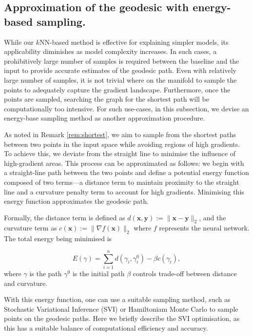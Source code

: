 \subsection{Approximation of the geodesic with energy-based sampling.}
 While our $k$NN-based method is effective for explaining simpler models, its applicability diminishes as model complexity increases. In such cases, a prohibitively large number of samples is required between the baseline and the input to provide accurate estimates of the geodesic path. Even with relatively large number of samples, it is not trivial where on the manifold to sample the points to adequately capture the gradient landscape. Furthermore, once the points are sampled, searching the graph for the shortest path will be computationally too intensive. For such use-cases, in this subsection, we devise an energy-base sampling method as another approximation procedure.

As noted in Remark \ref{rem:shortest}, we aim to sample from the shortest paths between two points in the input space while avoiding regions of high gradients. To achieve this, we deviate from the straight line to minimise the influence of high-gradient areas. This process can be approximated as follows: we begin with a straight-line path between the two points and define a potential energy function composed of two terms—a distance term to maintain proximity to the straight line and a curvature penalty term to account for high gradients. Minimising this energy function approximates the geodesic path.

Formally, the distance term is defined as $d(\textbf{x},\textbf{y}) := \|\textbf{x}-\textbf{y}\|_2$, and the curvature term as $c(\textbf{x}):=\|\nabla f(\textbf{x})\|_2$ where $f$ represents the neural network. The total energy being minimised is

\begin{equation}
E(\gamma) = \sum_{i=1}^{n} d(\gamma_i, \gamma^0_i) - \beta c(\gamma_i), 
\label{eq:energy}
\end{equation}
where $\gamma$ is the path $\gamma^0$ is the initial path $\beta$ controls trade-off between distance and curvature.

With this energy function, one can use a suitable sampling method, such as Stochastic Variational Inference (SVI) or Hamiltoniam Monte Carlo to sample points on the geodesic paths. Here we briefly describe the SVI optimisation, as this has a suitable balance of computational efficiency and accuracy.

